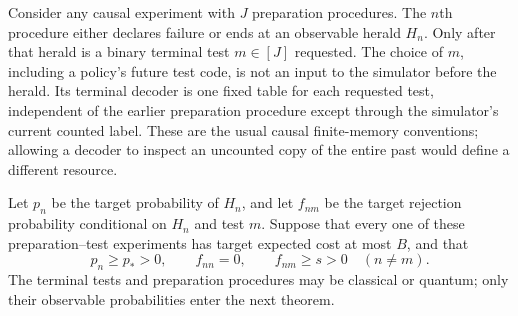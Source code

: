 Consider any causal experiment with $J$ preparation procedures.  The
$n$th procedure either declares failure or ends at an observable herald
$H_n$.  Only after that herald is a binary terminal test $m\in[J]$
requested.  The choice of $m$, including a policy's future test code,
is not an input to the simulator before the herald.  Its terminal decoder
is one fixed table for each requested
test, independent of the earlier preparation procedure except through
the simulator's current counted label.  These are the usual causal
finite-memory conventions; allowing a decoder to inspect an uncounted
copy of the entire past would define a different resource.

Let $p_n$ be the target probability of $H_n$, and let $f_{nm}$ be the
target rejection probability conditional on $H_n$ and test $m$.
Suppose that every one of these preparation--test experiments has
target expected cost at most $B$, and that
\begin{equation}\label{eq:r77-operational-exposure}
 p_n\ge p_*>0,\qquad f_{nn}=0,\qquad
 f_{nm}\ge s>0\quad(n\ne m).
\end{equation}
The terminal tests and preparation procedures may be classical or
quantum; only their observable probabilities enter the next theorem.

